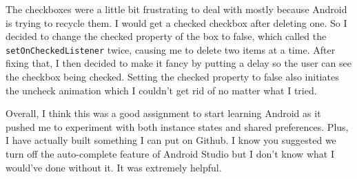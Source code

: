 \documentclass{article}
\begin{document}
The checkboxes were a little bit frustrating to deal with mostly because Android is trying to recycle them. I would get a checked checkbox after deleting one. So I decided to change the checked property of the box to false, which called the \texttt{setOnCheckedListener} twice, causing me to delete two items at a time. After fixing that, I then decided to make it fancy by putting a delay so the user can see the checkbox being checked. Setting the checked property to false also initiates the uncheck animation which I couldn't get rid of no matter what I tried. 
\hfill \linebreak

Overall, I think this was a good assignment to start learning Android as it pushed me to experiment with both instance states and shared preferences. Plus, I have actually built something I can put on Github. I know you suggested we turn off the auto-complete feature of Android Studio but I don't know what I would've done without it. It was extremely helpful. 
\end{document}
